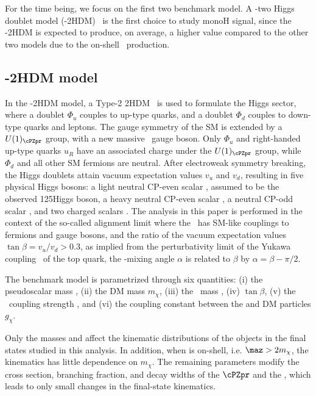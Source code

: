 For the time being, we focus on the first two benchmark model. A \cPZpr-two 
Higgs doublet model (\cPZpr-2HDM)~\cite{2HDM} is the first choice to study monoH signal, since the \cPZpr-2HDM is expected to produce, on 
average, a higher \MET value compared to the other two models due to
the on-shell \cPZpr\ production.%


\subsection{ \cPZpr-2HDM model}
In the \cPZpr-2HDM model,
a Type-2 2HDM~\cite{Lee:1973iz,Branco:2011iw} is used to formulate
the Higgs sector, where a doublet $\Phi_u$ couples to up-type quarks, and
a doublet $\Phi_d$ couples to down-type
quarks and leptons. The gauge symmetry of the SM is extended by a
$U(1)_{\cPZpr}$ group, with a new massive \cPZpr\ gauge boson.
Only $\Phi_u$ and right-handed up-type quarks $u_R$ have an associated charge
under the $U(1)_{\cPZpr}$ group, while $\Phi_d$ and all other SM
fermions are neutral.
After electroweak symmetry breaking, the Higgs doublets attain vacuum
expectation values $v_u$ and $v_d$,
resulting in five physical Higgs bosons:
a light neutral CP-even scalar \Ph, assumed to be the
observed 125\GeV Higgs boson, a heavy neutral CP-even scalar \PH,
a neutral CP-odd scalar \Az, and two charged scalars \Hpm.
The analysis in this paper is performed in the context of the so-called
alignment limit where the \Ph\ has SM-like couplings to fermions and gauge
bosons, and the ratio of the vacuum expectation values $\tan \beta = v_u/v_d > 0.3$, as implied from the perturbativity limit of the Yukawa
coupling~\cite{2HDM,Craig:2013hca} of the top quark, the \Ph-\PH mixing angle $\alpha$ is
related to $\beta$ by $\alpha = \beta - \pi/2$.

The benchmark model is parametrized through six quantities: (i) the pseudoscalar mass
\maz, (ii) the DM mass $m_{\chi}$, (iii) the \cPZpr\ mass \mzp,
(iv) $\tan \beta$, (v) the \cPZpr\ coupling strength \gzp, and (vi)
the coupling constant between the \Az and DM particles $g_{\chi}$.

Only the masses \maz and \mzp affect the kinematic
distributions of the objects in the final states studied in this analysis.
In addition, when \Az is on-shell, i.e. $\maz > 2 m_{\chi}$, the kinematics
has little dependence on $m_{\chi}$.
The remaining parameters modify the cross section, branching fraction, and decay
widths of the $\cPZpr$ and the \Az, which leads to only small changes in the
final-state kinematics.



